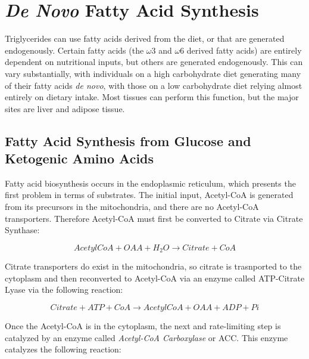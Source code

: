 \documentclass{tufte-handout}
\begin{document}
\section{\textit{De Novo} Fatty Acid Synthesis}

Triglycerides can use fatty acids derived from the diet, or that are generated endogenously.  Certain fatty acids (the $\omega$3 and $\omega$6 derived fatty acids) are entirely dependent on nutritional inputs, but others are generated endogenously.  This can vary substantially, with individuals on a high carbohydrate diet generating many of their fatty acids \textit{de novo}, with those on a low carbohydrate diet relying almost entirely on dietary intake.  Most tissues can perform this function, but the major sites are liver and adipose tissue.

\subsection{Fatty Acid Synthesis from Glucose and Ketogenic Amino Acids}


Fatty acid biosynthesis occurs in the endoplasmic reticulum, which presents the first problem in terms of substrates.  The initial input, Acetyl-CoA is generated from its precursors in the mitochondria, and there are no Acetyl-CoA transporters.  Therefore Acetyl-CoA must first be converted to Citrate via Citrate Synthase:


\begin{equation}\label{eq:acl}
AcetylCoA + OAA + H_2O \rightarrow Citrate + CoA
\end{equation}


Citrate transporters do exist in the mitochondria, so citrate is trasnported to the cytoplasm and then reconverted to Acetyl-CoA via an enzyme called ATP-Citrate Lyase via the following reaction:

\begin{equation}\label{eq:acl}
Citrate + ATP + CoA \rightarrow AcetylCoA + OAA + ADP + Pi
\end{equation}

Once the Acetyl-CoA is in the cytoplasm, the next and rate-limiting step is catalyzed by an enzyme called \emph{Acetyl-CoA Carboxylase} or ACC.  This enzyme catalyzes the following reaction:
\end{document}
